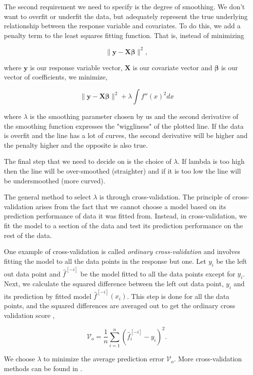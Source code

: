 The second requirement we need to specify is the degree of smoothing. We don't want to overfit or underfit the data, but adequately represent the true underlying relationship between the response variable and covariates. To do this, we add a penalty term to the least squares fitting function. That is, instead of minimizing 

$$
\|\mathbf{y}-\mathbf{X} \boldsymbol{\beta}\|^{2},
$$


where $\mathbf{y}$ is our response variable vector, $\mathbf{X}$ is our covariate vector and $\boldsymbol{\beta}$ is our vector of coefficients, we minimize, 

$$
\|\mathbf{y}-\mathbf{X} \boldsymbol{\beta}\|^{2} + \lambda \int f''(x)^2 dx 
$$

where $\lambda$ is the smoothing parameter chosen by us and the second derivative of the smoothing function expresses the "wiggliness" of the plotted line. If the data is overfit and the line has a lot of curves, the second derivative will be higher and the penalty higher and the opposite is also true. 

The final step that we need to decide on is the choice of $\lambda$. If lambda is too high then the line will be over-smoothed (straighter) and if it is too low the line will be undersmoothed (more curved). 


The general method to select $\lambda$ is through cross-validation. The principle of cross-validation arises from the fact that we cannot choose a model based on its prediction performance of data it was fitted from. Instead, in cross-validation, we fit the model to a section of the data and test its prediction performance on the rest of the data. 

 One example of cross-validation is called \textit{ordinary cross-validation} and involves fitting the model to all the data points in the response but one. Let $y_i$ be the left out data point and $\hat{f}^{[-i]}$ be the model fitted to all the data points except for $y_i$. Next, we calculate  the squared difference between the left out data point, $y_i$ and its prediction by fitted model $\hat{f}^{[-i]}(x_i)$.  This step is done for all the data points, and the squared differences are averaged out to get the ordinary cross validation score \citep{wood2017generalized}, 

$$
\mathcal{V}_{o}=\frac{1}{n} \sum_{i=1}^{n}\left(\hat{f}_{i}^{[-i]}-y_{i}\right)^{2}.
$$

We choose $\lambda$ to minimize the average prediction error $\mathcal{V}_{o}$. More cross-validation methods can be found in .




